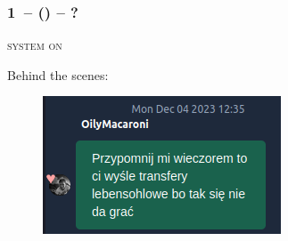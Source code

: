 \documentclass[12pt, a4paper]{article}
\begin{document}
\subsubsection*{1\ntx\ -- (\dbl) -- ?}

\textsc{system on}

\newpage

Behind the scenes:
\begin{figure}[H]
    \includegraphics[width=0.4\linewidth]{cuebids2.png}
\end{figure}
\end{document}
